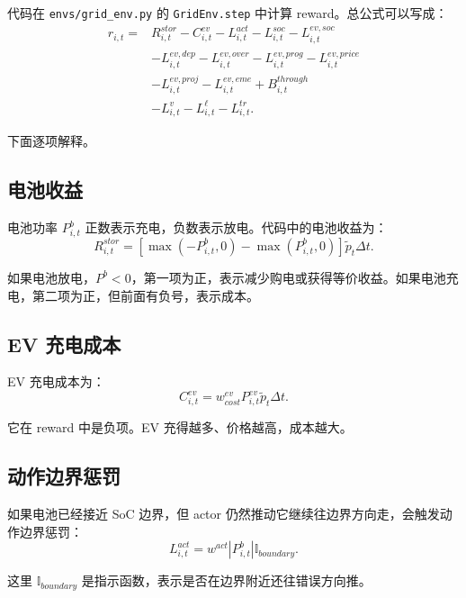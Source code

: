 \documentclass[UTF8,zihao=-4]{ctexart}
\begin{document}
代码在 \texttt{envs/grid\_env.py} 的 \texttt{GridEnv.step} 中计算 reward。总公式可以写成：
\begin{equation}
\begin{aligned}
r_{i,t}
=&
R^{stor}_{i,t}
-
C^{ev}_{i,t}
-L^{act}_{i,t}
-L^{soc}_{i,t}
-L^{ev,soc}_{i,t}\\
&-L^{ev,dep}_{i,t}
-L^{ev,over}_{i,t}
-L^{ev,prog}_{i,t}
-L^{ev,price}_{i,t}\\
&-L^{ev,proj}_{i,t}
-L^{ev,eme}_{i,t}
+B^{through}_{i,t}\\
&-L^v_{i,t}
-L^\ell_{i,t}
-L^{tr}_{i,t}.
\end{aligned}
\end{equation}

下面逐项解释。

\subsection{电池收益}

电池功率 $P^b_{i,t}$ 正数表示充电，负数表示放电。代码中的电池收益为：
\begin{equation}
R^{stor}_{i,t}
=
\left[
\max(-P^b_{i,t},0)
-
\max(P^b_{i,t},0)
\right]
\tilde p_t\Delta t.
\end{equation}

如果电池放电，$P^b<0$，第一项为正，表示减少购电或获得等价收益。如果电池充电，第二项为正，但前面有负号，表示成本。

\subsection{EV 充电成本}

EV 充电成本为：
\begin{equation}
C^{ev}_{i,t}
=
w^{ev}_{cost}
P^{ev}_{i,t}
\tilde p_t
\Delta t.
\end{equation}

它在 reward 中是负项。EV 充得越多、价格越高，成本越大。

\subsection{动作边界惩罚}

如果电池已经接近 SoC 边界，但 actor 仍然推动它继续往边界方向走，会触发动作边界惩罚：
\begin{equation}
L^{act}_{i,t}
=
w^{act}
|P^b_{i,t}|
\mathbb{I}_{boundary}.
\end{equation}

这里 $\mathbb{I}_{boundary}$ 是指示函数，表示是否在边界附近还往错误方向推。
\end{document}
